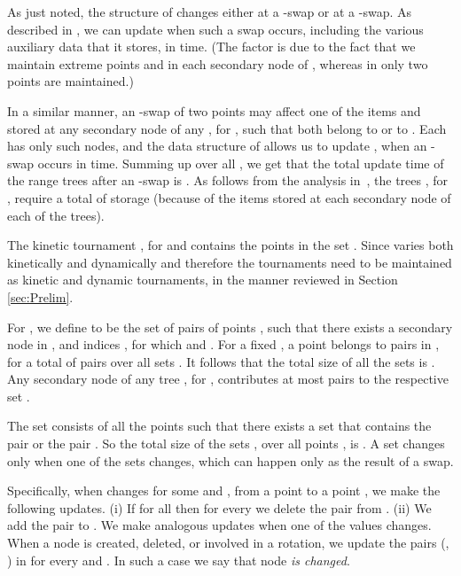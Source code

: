 \documentclass[letter,11pt]{article}
\begin{document}
\smallskip

As just noted, the structure of  changes either at a -swap or at a
-swap. As described in \cite[Section 4]{KineticNeighbors}, we
can update  when such a swap occurs, including the various auxiliary data that it stores, in  time. 
(The factor  is due to the fact that we maintain
 extreme points  and  in each
secondary node  of , whereas in \cite{KineticNeighbors} only
two points are maintained.)

In a similar manner, an -swap of two points  may affect one of the items 
and  stored at any secondary node  of any , for , such that both  belong to  or to . Each  has only  such nodes, and the data structure of \cite{KineticNeighbors} allows us to
update , when an -swap occurs in  time. Summing up over all , we get
that the total update time of the range trees after an -swap is
.  As follows from the analysis in~\cite[Section 4]{KineticNeighbors}, the
trees , for , require a total of  storage (because of the  items
 stored at each secondary node of each of the  trees).

\smallskip

The kinetic tournament , for  and  contains the points in the set .  Since 
varies both kinetically and dynamically and therefore the tournaments
 need to be maintained as kinetic and dynamic tournaments, in the manner reviewed in Section \ref{sec:Prelim}. 

For , we define  to be
the set of pairs of points , such that there exists a
secondary node  in , and indices , for which
 and .
For a fixed , a point  belongs to  pairs  in
, for a total of  pairs over all sets .  It follows that the total size of all the
sets  is .  Any secondary node of any tree
, for , contributes at most  pairs to
the respective set .


The set  consists of all the points  such that there exists a set
 that contains the pair  or the pair .  So the
total size of the sets , over all points , is . A set  changes only when one of the sets  changes,
which can happen only as the result of a swap.

Specifically, when  changes for some  and , from a point  to a point , we
make the following updates.  
(i) If  for all
 then for every  we delete the pair
 from . (ii) We add the
pair  to .  We make analogous updates
when one of the values  changes.  When a node  is created, deleted,
or involved in a rotation, we update the pairs (,
) in  for every  and . In such a case
we say that node  {\em is changed}.
\end{document}
